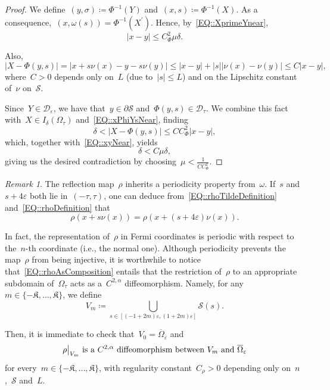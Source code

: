 \documentclass[12pt,a4paper]{amsart}
\numberwithin{equation}{section}
\theoremstyle{definition}
\theoremstyle{remark}
\newtheorem{remark}[theorem]{Remark}
\newcommand{\eps}{\varepsilon}
\newcommand{\abs}[1]{\left\lvert#1\right\rvert}
\newcommand{\restr}[2]{{\left.\kern-\nulldelimiterspace#1\vphantom{\big|}\right|_{#2}}}
\renewcommand{\leq}{\leqslant}
\begin{document}
\begin{proof}
    We define~$(y,\sigma) \coloneq \Phi^{-1}(Y)$ and~$(x,s) \coloneq \Phi^{-1}(X)$. As a consequence,~$(x,\omega(s)) = \Phi^{-1}(X^\prime)$. Hence, by~\eqref{EQ::XprimeYnear},
    \begin{equation}\label{EQ::xyNear}
        \abs{x-y} \leq C_\Phi^2 \mu \delta.
    \end{equation}

    Also,
    \begin{equation}\label{EQ::xPhiYsNear}
        \abs{X-\Phi(y,s)} = \abs{x+s\nu(x)-y-s\nu(y)} \leq \abs{x-y} + \abs{s}\abs{\nu(x)-\nu(y)}\leq C \abs{x-y},
    \end{equation}
    where~$C > 0$ depends only on~$L$ (due to~$\abs{s} \leq L$) and on the Lipschitz constant of~$\nu$ on~$\mathcal{S}$.

    Since~$Y \in \mathcal{D}_\eps$, we have that~$y \in \partial\mathcal{S}$ and~$\Phi(y,s) \in \mathcal{D}_\tau$. We combine this fact with~$X \in I_\delta(\Omega_\tau)$ and~\eqref{EQ::xPhiYsNear}, finding
    \begin{equation}
        \delta < \abs{X-\Phi(y,s)} \leq C C_\Phi^2 \abs{x-y},
    \end{equation}
    which, together with~\eqref{EQ::xyNear}, yields
    \begin{equation}
        \delta < C \mu \delta,
    \end{equation}
    giving us the desired contradiction by choosing~$\mu < \frac{1}{C C_\Phi^2}$.
\end{proof}

\begin{remark}
    The reflection map~$\rho$ inherits a periodicity property from~$\omega$. If~$s$ and~$s+4\eps$ both lie in~$(-\tau,\tau)$, one can deduce from~\eqref{EQ::rhoTildeDefinition} and~\eqref{EQ::rhoDefinition} that
    \[\rho(x+s\nu(x)) = \rho(x+(s+4\eps)\nu(x)).\]

    In fact, the representation of~$\rho$ in Fermi coordinates is periodic with respect to the~$n$-th coordinate (i.e., the normal one). Although periodicity prevents the map~$\rho$ from being injective, it is worthwhile to notice that~\eqref{EQ::rhoAsComposition} entails that the restriction of~$\rho$ to an appropriate subdomain of~$\Omega_\tau$ acts as a~$C^{2,\alpha}$ diffeomorphism. Namely, for any~$m \in \{-\mathfrak{K},\dots,\mathfrak{K}\}$, we define
    \begin{equation}\label{EQ::VkDefinition}
        V_m \coloneq \bigcup_{s \in [(-1+2m)\eps, (1+2m)\eps]} \mathcal{S}(s).
    \end{equation}

    Then, it is immediate to check that~$V_0 = \overline{\Omega}_\eps$ and
    \begin{equation}\label{EQ::rhoC2aDiffeomorphism}
        \restr{\rho}{V_m} \text{ is a } C^{2,\alpha} \text{ diffeomorphism between } V_m \text{ and } \overline{\Omega}_\eps
    \end{equation}
    for every~$m \in \{-\mathfrak{K},\dots,\mathfrak{K}\}$, with regularity constant~$C_\rho > 0$ depending only on~$n$,~$\mathcal{S}$ and~$L$.
\end{remark}
\end{document}
